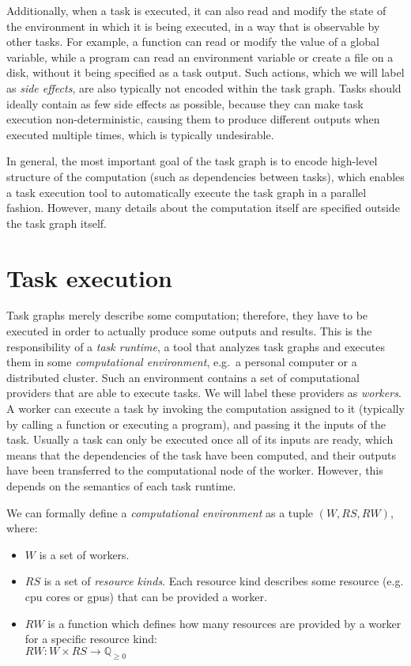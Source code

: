 Additionally, when a task is executed, it can also read and modify the state of the environment in
which it is being executed, in a way that is observable by other tasks. For example, a function can
read or modify the value of a global variable, while a program can read an environment variable or
create a file on a disk, without it being specified as a task output. Such actions, which we will
label as \emph{side effects}, are also typically not encoded within the task graph. Tasks should
ideally contain as few side effects as possible, because they can make task execution
non-deterministic, causing them to produce different outputs when executed multiple times, which is
typically undesirable.

In general, the most important goal of the task graph is to encode high-level structure of the
computation (such as dependencies between tasks), which enables a task execution tool to
automatically execute the task graph in a parallel fashion. However, many details about the
computation itself are specified outside the task graph itself.

\section{Task execution}
Task graphs merely describe some computation; therefore, they have to be executed in order to
actually produce some outputs and results. This is the responsibility of a \emph{task runtime},
a tool that analyzes task graphs and executes them in some \emph{computational environment}, e.g.\ a personal
computer or a distributed cluster. Such an environment contains a set of computational providers
that are able to execute tasks. We will label these providers as \emph{workers}. A worker
can execute a task by invoking the computation assigned to it (typically by calling a function or
executing a program), and passing it the inputs of the task. Usually a task can only be executed
once all of its inputs are ready, which means that the dependencies of the task have been computed,
and their outputs have been transferred to the computational node of the worker. However, this
depends on the semantics of each task runtime.

We can formally define a \emph{computational environment} as a tuple $(W, RS, RW)$, where:
\begin{itemize}[itemsep=0pt]
	\item $W$ is a set of workers.
	\item $RS$ is a set of \emph{resource kinds}. Each resource kind describes some
	      resource (e.g. \gls{cpu} cores or \glspl{gpu})
	      that can be provided a worker.
	\item $RW$ is a function which defines how many resources are provided by a
	      worker for a specific resource kind: \\ $RW\colon W \times RS \rightarrow \mathbb{Q}_{\geq{}0}$
\end{itemize}

